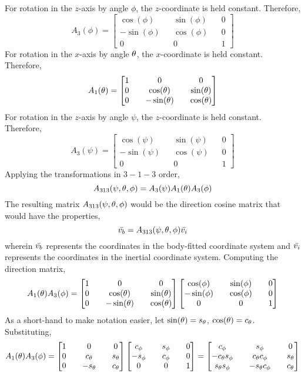 \documentclass[class=report, 12pt, crop=false]{standalone}
\begin{document}
\begin{center}
For rotation in the $z$-axis by angle $\phi$, the $z$-coordinate is held constant. Therefore,
$$A_{3}(\phi) = \begin{bmatrix}
\cos(\phi) && \sin(\phi) && 0 \\
-\sin(\phi) && \cos(\phi) && 0 \\
0 && 0 && 1 
\end{bmatrix}$$
For rotation in the $x$-axis by angle $\theta$, the $x$-coordinate is held constant. Therefore,
$$A_{1}(\theta) = \begin{bmatrix}
1 && 0 && 0 \\
0 && \cos(\theta) && \sin(\theta) \\
0 && -\sin(\theta) && \cos(\theta) 
\end{bmatrix}$$
For rotation in the $z$-axis by angle $\psi$, the $z$-coordinate is held constant. Therefore,
$$A_{3}(\psi) = \begin{bmatrix}
\cos(\psi) && \sin(\psi) && 0 \\
-\sin(\psi) && \cos(\psi) && 0 \\
0 && 0 && 1 
\end{bmatrix}$$
Applying the transformations in $3-1-3$ order,
$$A_{313}(\psi,\theta,\phi) = A_{3}(\psi)A_{1}(\theta)A_{3}(\phi)$$
The resulting matrix $A_{313}(\psi,\theta,\phi)$ would be the direction cosine matrix that would have the properties,
$$\bar{v_b} = A_{313}(\psi,\theta,\phi)\bar{v_i}$$
wherein $\bar{v_b}$ represents the coordinates in the body-fitted coordinate system and $\bar{v_i}$ represents the coordinates in the inertial coordinate system. Computing the direction matrix,
$$A_{1}(\theta)A_{3}(\phi) = \begin{bmatrix}
1 && 0 && 0 \\
0 && \cos(\theta) && \sin(\theta) \\
0 && -\sin(\theta) && \cos(\theta) 
\end{bmatrix}\begin{bmatrix}
\cos(\phi) && \sin(\phi) && 0 \\
-\sin(\phi) && \cos(\phi) && 0 \\
0 && 0 && 1 
\end{bmatrix}$$
As a short-hand to make notation easier, let $\sin(\theta)=s_\theta$, $\cos(\theta)=c_\theta$. Substituting,
$$A_{1}(\theta)A_{3}(\phi) = \begin{bmatrix}
1 && 0 && 0 \\
0 && c_\theta && s_\theta \\
0 && -s_\theta && c_\theta 
\end{bmatrix}\begin{bmatrix}
c_\phi && s_\phi && 0 \\
-s_\phi && c_\phi && 0 \\
0 && 0 && 1 
\end{bmatrix} = \begin{bmatrix}
c_\phi && s_\phi && 0 \\
-c_\theta s_\phi && c_\theta c_\phi && s_\theta \\
s_\theta s_\phi && -s_\theta c_\phi && c_\theta 
\end{bmatrix}$$


\end{center}
\end{document}

